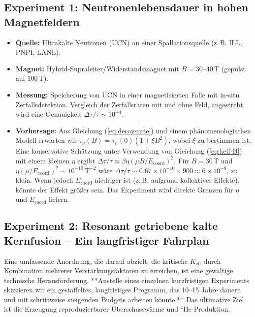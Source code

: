 \documentclass[12pt]{article}
\theoremstyle{remark}
\newcommand{\Keff}{K_{\mathrm{eff}}}
\begin{document}
	\subsection{Experiment 1: Neutronenlebensdauer in hohen Magnetfeldern}
	
	\begin{itemize}
		\item \textbf{Quelle:} Ultrakalte Neutronen (UCN) an einer Spallationsquelle (z. B. ILL, PNPI, LANL).
		\item \textbf{Magnet:} Hybrid-Supraleiter/Widerstandsmagnet mit \(B = 30\)–\(40\,\text{T}\) (gepulst auf \(100\,\text{T}\)).
		\item \textbf{Messung:} Speicherung von UCN in einer magnetisierten Falle mit in-situ Zerfallsdetektion. Vergleich der Zerfallsraten mit und ohne Feld, angestrebt wird eine Genauigkeit \(\Delta \tau / \tau \sim 10^{-4}\).
		\item \textbf{Vorhersage:} Aus Gleichung (\ref{eq:decay-rate}) und einem phänomenologischen Modell erwarten wir \(\tau_n(B) = \tau_n(0) (1 + \xi B^2)\), wobei \(\xi\) zu bestimmen ist. Eine konservative Schätzung unter Verwendung von Gleichung (\ref{eq:keff-B}) mit einem kleinen \(\eta\) ergibt \(\Delta \tau/\tau \approx \beta \eta (\mu B/E_{\mathrm{coord}})^2\). Für \(B = 30\,\text{T}\) und \(\eta (\mu/E_{\mathrm{coord}})^2 \sim 10^{-10}\,\text{T}^{-2}\) wäre \(\Delta \tau/\tau \sim 0.67 \times 10^{-10} \times 900 \approx 6\times10^{-8}\), zu klein. Wenn jedoch \(E_{\mathrm{coord}}\) niedriger ist (z. B. aufgrund kollektiver Effekte), könnte der Effekt größer sein. Das Experiment wird direkte Grenzen für \(\eta\) und \(E_{\mathrm{coord}}\) liefern.
	\end{itemize}
	
	\subsection{Experiment 2: Resonant getriebene kalte Kernfusion – Ein langfristiger Fahrplan}
	
	Eine umfassende Anordnung, die darauf abzielt, die kritische \(\Keff\) durch Kombination mehrerer Verstärkungsfaktoren zu erreichen, ist eine gewaltige technische Herausforderung. **Anstelle eines einzelnen kurzfristigen Experiments skizzieren wir ein gestaffeltes, langfristiges Programm, das 10–15 Jahre dauern und mit schrittweise steigenden Budgets arbeiten könnte.** Das ultimative Ziel ist die Erzeugung reproduzierbarer Überschusswärme und \(^4\)He-Produktion.
	
\end{document}
